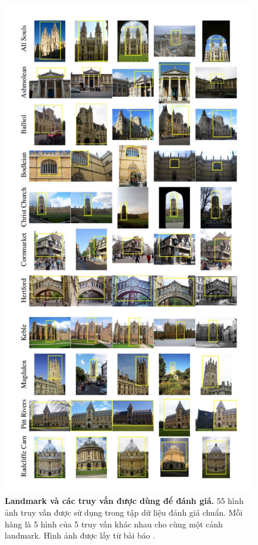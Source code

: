 \begin{figure}[!htbp]
\begin{center}
      \includegraphics[scale=0.27]{oxfordDataset}
    \fi
    \caption[Landmark và các truy vấn được dùng để đánh giá]{\textbf{Landmark và các truy vấn được dùng để đánh giá.} 55 hình ảnh truy vấn được sử dụng trong tập dữ liệu đánh giá chuẩn. Mỗi hàng là 5 hình của 5 truy vấn khác nhau cho cùng một cảnh landmark. Hình ảnh được lấy từ bài báo \citep{philbin2007object}.}
    \label{FigOxfordDataset}
  \end{center}
\end{figure}

